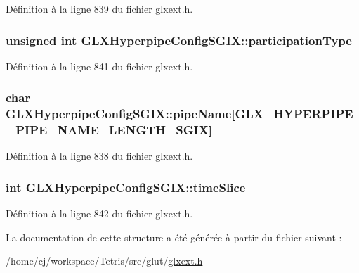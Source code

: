 Définition à la ligne 839 du fichier glxext.\-h.

\hypertarget{struct_g_l_x_hyperpipe_config_s_g_i_x_a093cfaaec305531f66e1120929b5b01b}{
\subsubsection[{participation\-Type}]{\setlength{\rightskip}{0pt plus 5cm}unsigned int G\-L\-X\-Hyperpipe\-Config\-S\-G\-I\-X\-::participation\-Type}}\label{struct_g_l_x_hyperpipe_config_s_g_i_x_a093cfaaec305531f66e1120929b5b01b}


Définition à la ligne 841 du fichier glxext.\-h.

\hypertarget{struct_g_l_x_hyperpipe_config_s_g_i_x_a9e3748f92005cac81cb44d4c67acccb8}{
\subsubsection[{pipe\-Name}]{\setlength{\rightskip}{0pt plus 5cm}char G\-L\-X\-Hyperpipe\-Config\-S\-G\-I\-X\-::pipe\-Name\mbox{[}{\bf G\-L\-X\-\_\-\-H\-Y\-P\-E\-R\-P\-I\-P\-E\-\_\-\-P\-I\-P\-E\-\_\-\-N\-A\-M\-E\-\_\-\-L\-E\-N\-G\-T\-H\-\_\-\-S\-G\-I\-X}\mbox{]}}}\label{struct_g_l_x_hyperpipe_config_s_g_i_x_a9e3748f92005cac81cb44d4c67acccb8}


Définition à la ligne 838 du fichier glxext.\-h.

\hypertarget{struct_g_l_x_hyperpipe_config_s_g_i_x_afe9288e75dc1ae5e0f33eff978d7024d}{
\subsubsection[{time\-Slice}]{\setlength{\rightskip}{0pt plus 5cm}int G\-L\-X\-Hyperpipe\-Config\-S\-G\-I\-X\-::time\-Slice}}\label{struct_g_l_x_hyperpipe_config_s_g_i_x_afe9288e75dc1ae5e0f33eff978d7024d}


Définition à la ligne 842 du fichier glxext.\-h.



La documentation de cette structure a été générée à partir du fichier suivant \-:\begin{DoxyCompactItemize}
\item 
/home/cj/workspace/\-Tetris/src/glut/\hyperlink{glxext_8h}{glxext.\-h}\end{DoxyCompactItemize}
